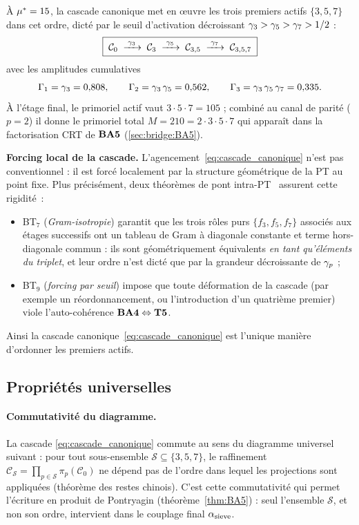 À $\mu^{*} = 15$, la cascade canonique met en œuvre les trois premiers actifs $\{3, 5, 7\}$ dans cet ordre, dicté par le seuil d'activation décroissant $\gamma_{3} > \gamma_{5} > \gamma_{7} > 1/2$ :
\begin{equation}
\boxed{\;
\mathcal C_0 \;\xrightarrow{\;\gamma_{3}\;}\; \mathcal C_3
\;\xrightarrow{\;\gamma_{5}\;}\; \mathcal C_{3,5}
\;\xrightarrow{\;\gamma_{7}\;}\; \mathcal C_{3,5,7} \;}
\label{eq:cascade_canonique}
\end{equation}
avec les amplitudes cumulatives
\[
\Gamma_1 = \gamma_{3} = 0{,}808, \qquad
\Gamma_2 = \gamma_{3}\,\gamma_{5} = 0{,}562, \qquad
\Gamma_3 = \gamma_{3}\,\gamma_{5}\,\gamma_{7} = 0{,}335.
\]
À l'étage final, le primoriel actif vaut $3 \cdot 5 \cdot 7 = 105$ ; combiné au canal de parité ($p = 2$) il donne le primoriel total $M = 210 = 2 \cdot 3 \cdot 5 \cdot 7$ qui apparaît dans la factorisation CRT de $\textbf{BA5}$ (\ref{sec:bridge:BA5}).

\textbf{Forcing local de la cascade.} L'agencement~\eqref{eq:cascade_canonique} n'est pas conventionnel : il est forcé localement par la structure géométrique de la PT au point fixe. Plus précisément, deux théorèmes de pont intra-PT~\cite{PT_NewMath_BT} assurent cette rigidité~:
\begin{itemize}[nosep,leftmargin=*]
\item BT$_7$ (\emph{Gram-isotropie}) garantit que les trois rôles purs $\{f_3, f_5, f_7\}$ associés aux étages successifs ont un tableau de Gram à diagonale constante et terme hors-diagonale commun : ils sont géométriquement équivalents \emph{en tant qu'éléments du triplet}, et leur ordre n'est dicté que par la grandeur décroissante de $\gamma_{p}$ ;
\item BT$_9$ (\emph{forcing par seuil}) impose que toute déformation de la cascade (par exemple un réordonnancement, ou l'introduction d'un quatrième premier) viole l'auto-cohérence $\textbf{BA4} \Leftrightarrow \textbf{T5}$.
\end{itemize}
Ainsi la cascade canonique~\eqref{eq:cascade_canonique} est l'unique manière d'ordonner les premiers actifs.

\subsection{Propriétés universelles}
\label{sec:cascade:univ}

\paragraph{Commutativité du diagramme.}
La cascade \eqref{eq:cascade_canonique} commute au sens du diagramme universel suivant : pour tout sous-ensemble $\mathcal S \subseteq \{3, 5, 7\}$, le raffinement $\mathcal C_{\mathcal S} = \prod_{p \in \mathcal S} \pi_p (\mathcal C_0)$ ne dépend pas de l'ordre dans lequel les projections sont appliquées (théorème des restes chinois). C'est cette commutativité qui permet l'écriture en produit de Pontryagin (théorème~\ref{thm:BA5}) : seul l'ensemble $\mathcal S$, et non son ordre, intervient dans le couplage final $\alpha_{\rm sieve}$.


